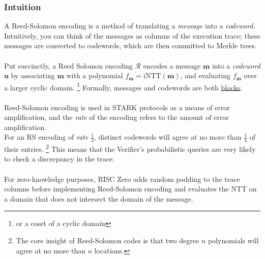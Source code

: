 \documentclass[10pt,letterpaper,titlepage]{article}
\theoremstyle{definition}
\begin{document}
\begin{appendices}
\subsubsection{Intuition}
A Reed-Solomon encoding is a method of translating a \textit{message} into a \textit{codeword}.
Intuitively, you can think of the messages as columns of the execution trace;
these messages are converted to codewords, which are then committed to Merkle trees.  \\
\\
Put succinctly, a Reed Solomon encoding $\mathcal{R}$ encodes a message $\mathbf{m}$ into a \textit{codeword} $\mathbf{u}$ by associating $\mathbf{m}$ with a polynomial $f_{\mathbf{m}} = \text{iNTT}(\mathbf{m})$, and evaluating $f_{\mathbf{m}}$ over a larger cyclic domain.%
\footnote{or a coset of a cyclic domain}
Formally, messages and codewords are both \hyperref[blocks]{blocks}. \\
\\
Reed-Solomon encoding is used in STARK protocols as a means of error amplification, and the \textit{rate} of the encoding refers to the amount of error amplification. \\
For an RS encoding of \textit{rate} $\frac{1}{4}$, distinct codewords will agree at no more than $\frac{1}{4}$ of their entries.%
\footnote{The core insight of Reed-Solomon codes is that two degree $n$ polynomials will agree at no more than $n$ locations.}
This means that the Verifier's probabilistic queries are very likely to check a discrepancy in the trace.
\\
\\
For zero-knowledge purposes, RISC Zero adds random padding to the trace columns before implementing Reed-Solomon encoding and evaluates the NTT on a domain that does not intersect the domain of the message.


\end{appendices}
\end{document}
